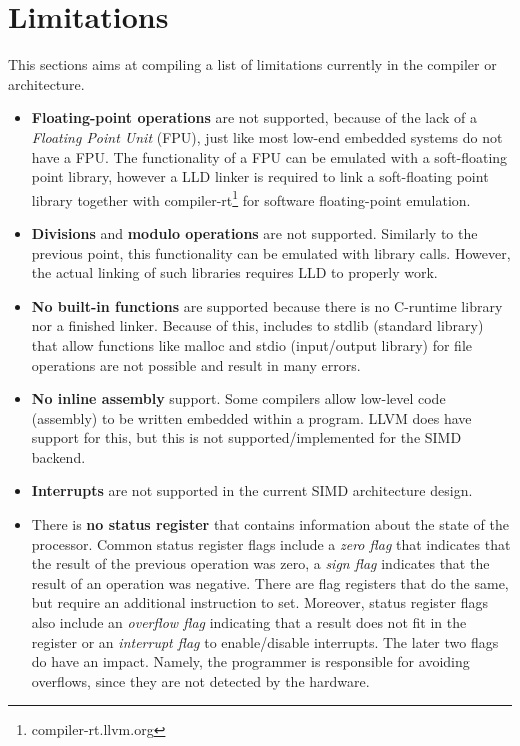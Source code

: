 \section{Limitations}\label{sec:limitations}
This sections aims at compiling a list of limitations currently in the compiler or architecture.
\begin{itemize}
    \item \textbf{Floating-point operations} are not supported, because of the lack of a \emph{Floating Point Unit} (FPU), just like most low-end embedded systems do not have a FPU. The functionality of a FPU can be emulated with a soft-floating point library, however a LLD linker is required to link a soft-floating point library together with compiler-rt\footnote{compiler-rt.llvm.org} for software floating-point emulation.
    \item \textbf{Divisions} and \textbf{modulo operations} are not supported. Similarly to the previous point, this functionality can be emulated with library calls. However, the actual linking of such libraries requires LLD to properly work.
    \item \textbf{No built-in functions} are supported because there is no C-runtime library nor a finished linker. Because of this, includes to stdlib (standard library) that allow functions like malloc and stdio (input/output library) for file operations are not possible and result in many errors.
    \item \textbf{No inline assembly} support. Some compilers allow low-level code (assembly) to be written embedded within a program. LLVM does have support for this, but this is not supported/implemented for the SIMD backend.
    \item \textbf{Interrupts} are not supported in the current SIMD architecture design. 
    \item There is \textbf{no status register} that contains information about the state of the processor. Common status register flags include a \emph{zero flag} that indicates that the result of the previous operation was zero, a \emph{sign flag} indicates that the result of an operation was negative. There are flag registers that do the same, but require an additional instruction to set. Moreover, status register flags also include an \emph{overflow flag} indicating that a result does not fit in the register or an \emph{interrupt flag} to enable/disable interrupts. The later two flags do have an impact. Namely, the programmer is responsible for avoiding overflows, since they are not detected by the hardware. 
\end{itemize}

